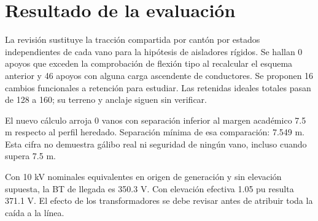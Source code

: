 \setcounter{section}{1}
\section{Resultado de la evaluación}
La revisión sustituye la tracción compartida por cantón por estados independientes de cada vano para la hipótesis de aisladores rígidos. Se hallan 0 apoyos que exceden la comprobación de flexión tipo al recalcular el esquema anterior y 46 apoyos con alguna carga ascendente de conductores. Se proponen 16 cambios funcionales a retención para estudiar. Las retenidas ideales totales pasan de 128 a 160; su terreno y anclaje siguen sin verificar.

El nuevo cálculo arroja 0 vanos con separación inferior al margen académico 7.5 m respecto al perfil heredado. Separación mínima de esa comparación: 7.549 m. Esta cifra no demuestra gálibo real ni seguridad de ningún vano, incluso cuando supera 7.5 m.

Con 10 kV nominales equivalentes en origen de generación y sin elevación supuesta, la BT de llegada es 350.3 V. Con elevación efectiva 1.05 pu resulta 371.1 V. El efecto de los transformadores se debe revisar antes de atribuir toda la caída a la línea.

